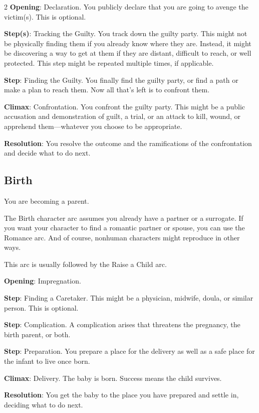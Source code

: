 \begin{multicols}{2}
\textbf{Opening}: Declaration. You publicly declare that you are going to avenge the victim(s). This is optional.

\textbf{Step(s)}: Tracking the Guilty. You track down the guilty party. This might not be physically finding them if you already know where they are. Instead, it might be discovering a way to get at them if they are distant, difficult to reach, or well protected. This step might be repeated multiple times, if applicable.

\textbf{Step}: Finding the Guilty. You finally find the guilty party, or find a path or make a plan to reach them. Now all that’s left is to confront them.

\textbf{Climax}: Confrontation. You confront the guilty party. This might be a public accusation and demonstration of guilt, a trial, or an attack to kill, wound, or apprehend them—whatever you choose to be appropriate. 

\textbf{Resolution}: You resolve the outcome and the ramifications of the confrontation and decide what to do next.

\subsection{Birth}

You are becoming a parent.

The Birth character arc assumes you already have a partner or a surrogate. If you want your character to find a romantic partner or spouse, you can use the Romance arc. And of course, nonhuman characters might reproduce in other ways.

This arc is usually followed by the Raise a Child arc.

\textbf{Opening}: Impregnation.

\textbf{Step}: Finding a Caretaker. This might be a physician, midwife, doula, or similar person. This is optional.

\textbf{Step}: Complication. A complication arises that threatens the pregnancy, the birth parent, or both.

\textbf{Step}: Preparation. You prepare a place for the delivery as well as a safe place for the infant to live once born.

\textbf{Climax}: Delivery. The baby is born. Success means the child survives.

\textbf{Resolution}: You get the baby to the place you have prepared and settle in, deciding what to do next.


\end{multicols}
